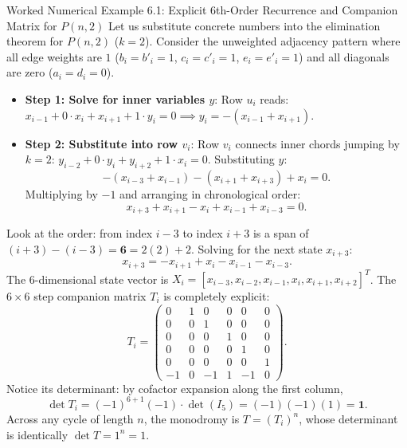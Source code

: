 \documentclass[11pt]{article}
\begin{document}
\begin{callbox}{Worked Numerical Example 6.1: Explicit 6th-Order Recurrence and Companion Matrix for $P(n,2)$}
Let us substitute concrete numbers into the elimination theorem for $P(n,2)$ ($k=2$).
Consider the unweighted adjacency pattern where all edge weights are $1$ ($b_i = b'_i = 1$, $c_i = c'_i = 1$, $e_i = e'_i = 1$) and all diagonals are zero ($a_i = d_i = 0$).
\begin{itemize}[leftmargin=*,nosep]
  \item \textbf{Step 1: Solve for inner variables $y$}:
  Row $u_i$ reads: $x_{i-1} + 0 \cdot x_i + x_{i+1} + 1 \cdot y_i = 0 \implies y_i = -(x_{i-1} + x_{i+1})$.
  \item \textbf{Step 2: Substitute into row $v_i$}:
  Row $v_i$ connects inner chords jumping by $k=2$: $y_{i-2} + 0 \cdot y_i + y_{i+2} + 1 \cdot x_i = 0$.
  Substituting $y$:
  \begin{equation}
    -\left(x_{i-3} + x_{i-1}\right) - \left(x_{i+1} + x_{i+3}\right) + x_i = 0.
  \end{equation}
  Multiplying by $-1$ and arranging in chronological order:
  \begin{equation}
    x_{i+3} + x_{i+1} - x_i + x_{i-1} + x_{i-3} = 0.
  \end{equation}
\end{itemize}
Look at the order: from index $i-3$ to index $i+3$ is a span of $(i+3) - (i-3) = \mathbf{6} = 2(2) + 2$.
Solving for the next state $x_{i+3}$:
\begin{equation}
  x_{i+3} = -x_{i+1} + x_i - x_{i-1} - x_{i-3}.
\end{equation}
The 6-dimensional state vector is $X_i = [x_{i-3}, x_{i-2}, x_{i-1}, x_i, x_{i+1}, x_{i+2}]^T$.
The $6 \times 6$ step companion matrix $T_i$ is completely explicit:
\begin{equation}
  T_i = \begin{pmatrix}
    0 & 1 & 0 & 0 & 0 & 0 \\
    0 & 0 & 1 & 0 & 0 & 0 \\
    0 & 0 & 0 & 1 & 0 & 0 \\
    0 & 0 & 0 & 0 & 1 & 0 \\
    0 & 0 & 0 & 0 & 0 & 1 \\
    -1 & 0 & -1 & 1 & -1 & 0
  \end{pmatrix}.
\end{equation}
Notice its determinant: by cofactor expansion along the first column,
\begin{equation}
  \det T_i = (-1)^{6+1} (-1) \cdot \det(I_5) = (-1)(-1)(1) = \mathbf{1}.
\end{equation}
Across any cycle of length $n$, the monodromy is $T = (T_i)^n$, whose determinant is identically $\det T = 1^n = 1$.
\end{callbox}
\end{document}
